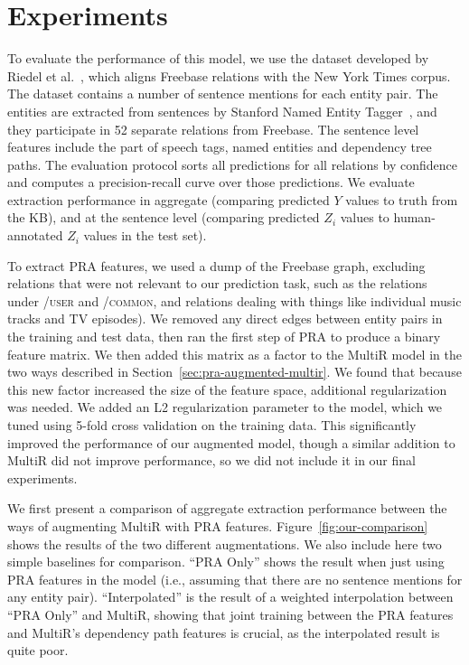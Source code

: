 \documentclass[11pt,a4paper]{article}
\newcommand{\secref}[1]{Section~\ref{sec:#1}}
\newcommand{\figref}[1]{Figure~\ref{fig:#1}}
\newcommand{\relation}[1]{\textsc{#1}}
\begin{document}
\section{Experiments}

To evaluate the performance of this model, we use the dataset developed by
Riedel et al.~, which aligns
Freebase relations with the New York Times corpus.  The dataset contains a
number of sentence mentions for each entity pair. The entities are extracted
from sentences by Stanford Named Entity Tagger~\cite{finkel-2005-non-local-ie},
and they participate in 52 separate relations from Freebase.  The sentence
level features include the part of speech tags, named entities and dependency
tree paths.  The evaluation protocol sorts all predictions for all relations by
confidence and computes a precision-recall curve over those predictions.  We
evaluate extraction performance in aggregate (comparing predicted $Y$ values to
truth from the KB), and at the sentence level (comparing predicted $Z_i$ values
to human-annotated $Z_i$ values in the test set).

To extract PRA features, we used a dump of the Freebase graph, excluding
relations that were not relevant to our prediction task, such as the relations
under \relation{/user} and \relation{/common}, and relations dealing with
things like individual music tracks and TV episodes).  We removed any direct
edges between entity pairs in the training and test data, then ran the first
step of PRA to produce a binary feature matrix.  We then added this matrix as a
factor to the MultiR model in the two ways described in
\secref{pra-augmented-multir}.  We found that because this new factor increased
the size of the feature space, additional regularization was needed.  We added
an L2 regularization parameter to the model, which we tuned using 5-fold cross
validation on the training data.  This significantly improved the performance
of our augmented model, though a similar addition to MultiR did not improve
performance, so we did not include it in our final experiments.

We first present a comparison of aggregate extraction performance between the
ways of augmenting MultiR with PRA features.  \figref{our-comparison} shows the
results of the two different augmentations.  We also include here two simple
baselines for comparison.  ``PRA Only'' shows the result when just using PRA
features in the model (i.e., assuming that there are no sentence mentions for
any entity pair).  ``Interpolated'' is the result of a weighted
interpolation between ``PRA Only'' and MultiR, showing that joint training
between the PRA features and MultiR's dependency path features is crucial, as
the interpolated result is quite poor.
\end{document}
